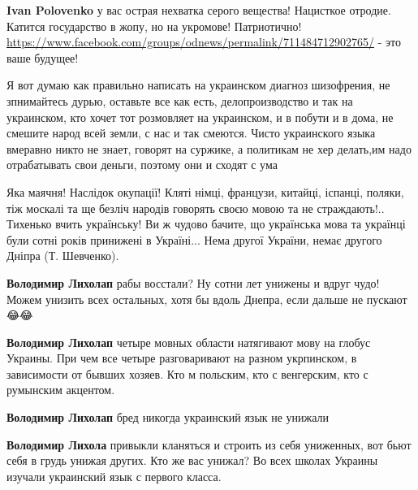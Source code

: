 \begin{itemize}
\begin{itemize}

\textbf{Ivan Polovenko} у вас острая нехватка серого вещества! Нацисткое отродие.
Катится государство в жопу, но на укромове! Патриотично!
\url{https://www.facebook.com/groups/odnews/permalink/711484712902765/} - это ваше будущее!
\end{itemize}


Я вот думаю как правильно написать на украинском диагноз шизофрения, не
зпнимайтесь дурью, оставьте все как есть, делопроизводство и так на украинском,
кто хочет тот розмовляет на украинском, и в побути и в дома, не смешите народ
всей земли, с нас и так смеются. Чисто украинского языка вмеравно никто не
знает, говорят на суржике, а политикам не хер делать,им надо отрабатывать свои
деньги, поэтому они и сходят с ума



Яка маячня! Наслідок окупації! Кляті німці, французи, китайці, іспанці, поляки,
тіж москалі та ще безліч народів говорять своєю мовою та не страждають!..
Тихенько вчить українську! Ви ж чудово бачите, що українська мова та українці
були сотні років принижені в Україні... Нема другої України, немає другого
Дніпра (Т. Шевченко).

\begin{itemize}
\textbf{Володимир Лихолап} рабы восстали? Ну сотни лет унижены и вдруг чудо! Можем унизить всех остальных, хотя бы вдоль Днепра, если дальше не пускают 😂😂

\textbf{Володимир Лихолап} четыре мовных области натягивают мову на глобус Украины. При чем все четыре разговаривают на разном укрпинском, в зависимости от бывших хозяев. Кто м польским, кто с венгерским, кто с румынским акцентом.

\textbf{Володимир Лихолап} бред никогда украинский язык не унижали

\textbf{Володимир Лихола} привыкли кланяться и строить из себя униженных, вот бьют себя в грудь унижая других. Кто же вас унижал? Во всех школах Украины изучали украинский язык с первого класса.


\end{itemize}
\end{itemize}
